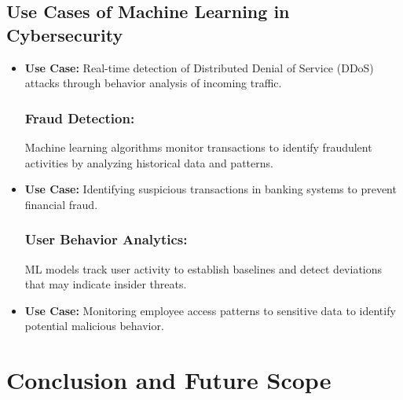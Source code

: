 \documentclass[oneside,a4paper,12pt]{report}
\begin{document}
\section{Use Cases of Machine Learning in Cybersecurity}
\vspace*{1\baselineskip}
\begin{itemize}
    \subsection{Threat Detection:} Machine learning models analyze network traffic patterns to identify anomalies indicative of potential security threats.
    \item \textbf{Use Case:} Real-time detection of Distributed Denial of Service (DDoS) attacks through behavior analysis of incoming traffic.
    \newline
    \subsection{Fraud Detection:} Machine learning algorithms monitor transactions to identify fraudulent activities by analyzing historical data and patterns.
    \item \textbf{Use Case:} Identifying suspicious transactions in banking systems to prevent financial fraud.
    \subsection{User Behavior Analytics:} ML models track user activity to establish baselines and detect deviations that may indicate insider threats.
    \item \textbf{Use Case:} Monitoring employee access patterns to sensitive data to identify potential malicious behavior.
\end{itemize}






















\newpage
\chapter{Conclusion and Future Scope}
\end{document}
